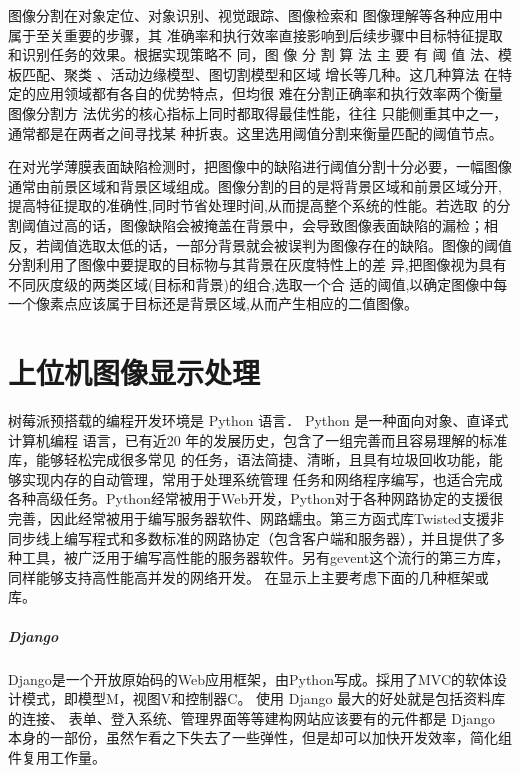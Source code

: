 图像分割在对象定位、对象识别、视觉跟踪、图像检索和
图像理解等各种应用中属于至关重要的步骤，其
准确率和执行效率直接影响到后续步骤中目标特征提取和识别任务的效果。根据实现策略不
同，图 像 分 割 算 法 主 要 有 阈 值 法、模板匹配、聚类
、活动边缘模型、图切割模型和区域
增长等几种。这几种算法
在特定的应用领域都有各自的优势特点，但均很
难在分割正确率和执行效率两个衡量图像分割方
法优劣的核心指标上同时都取得最佳性能，往往
只能侧重其中之一，通常都是在两者之间寻找某
种折衷。这里选用阈值分割来衡量匹配的阈值节点\cite{fenge}。



在对光学薄膜表面缺陷检测时，把图像中的缺陷进行阈值分割十分必要，一幅图像通常由前景区域和背景区域组成。图像分割的目的是将背景区域和前景区域分开,提高特征提取的准确性,同时节省处理时间,从而提高整个系统的性能。若选取
的分割阈值过高的话，图像缺陷会被掩盖在背景中，会导致图像表面缺陷的漏检；相 反，若阈值选取太低的话，一部分背景就会被误判为图像存在的缺陷。图像的阈值分割利用了图像中要提取的目标物与其背景在灰度特性上的差
异,把图像视为具有不同灰度级的两类区域(目标和背景)的组合,选取一个合
适的阈值,以确定图像中每一个像素点应该属于目标还是背景区域,从而产生相应的二值图像\cite{guleialgo}。



\section{上位机图像显示处理}
树莓派预搭载的编程开发环境是 Python 语言． Python 是一种面向对象、直译式计算机编程
语言，已有近20 年的发展历史，包含了一组完善而且容易理解的标准库，能够轻松完成很多常见
的任务，语法简捷、清晰，且具有垃圾回收功能，能够实现内存的自动管理，常用于处理系统管理
任务和网络程序编写，也适合完成各种高级任务。Python经常被用于Web开发，Python对于各种网路协定的支援很完善，因此经常被用于编写服务器软件、网路蠕虫。第三方函式库Twisted支援非同步线上编写程式和多数标准的网路协定（包含客户端和服务器），并且提供了多种工具，被广泛用于编写高性能的服务器软件。另有gevent这个流行的第三方库，同样能够支持高性能高并发的网络开发。\cite{raspnet}
在显示上主要考虑下面的几种框架或库\cite{rasgpio}。

\subparagraph{Django}
Django是一个开放原始码的Web应用框架，由Python写成。採用了MVC的软体设计模式，即模型M，视图V和控制器C。
使用 Django 最大的好处就是包括资料库的连接、 表单、登入系统、管理界面等等建构网站应该要有的元件都是 Django 本身的一部份，虽然乍看之下失去了一些弹性，但是却可以加快开发效率，简化组件复用工作量。

